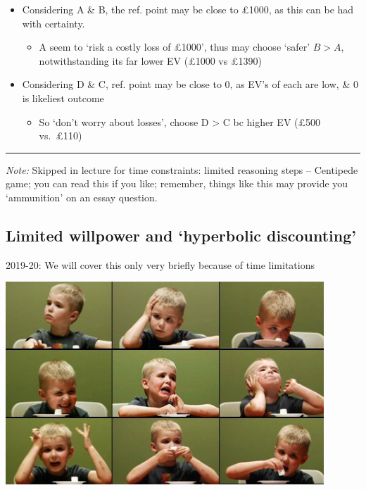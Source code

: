 \documentclass[]{article}
\providecommand{\tightlist}{%
  \setlength{\itemsep}{0pt}\setlength{\parskip}{0pt}}
\begin{document}
\bigskip

\begin{itemize}
\tightlist
\item
  Considering A \& B, the ref. point may be close to \pounds1000, as
  this can be had with certainty.

  \begin{itemize}
  \tightlist
  \item
    A seem to `risk a costly loss of \pounds1000', thus may choose
    `safer' \(B>A\), notwithstanding its far lower EV (\pounds1000 vs
    \pounds1390)
  \end{itemize}
\end{itemize}

\bigskip

\begin{itemize}
\tightlist
\item
  Considering D \& C, ref. point may be close to 0, as EV's of each are
  low, \& 0 is likeliest outcome

  \begin{itemize}
  \tightlist
  \item
    So `don't worry about losses', choose D \textgreater{} C bc higher
    EV (\pounds500 vs.~\pounds110)
  \end{itemize}
\end{itemize}

\begin{center}\rule{0.5\linewidth}{\linethickness}\end{center}

\emph{Note:} Skipped in lecture for time constraints: limited reasoning
steps -- Centipede game; you can read this if you like; remember, things
like this may provide you `ammunition' on an essay question.

\hypertarget{limited-willpower-and-hyperbolic-discounting}{%
\subsection{Limited willpower and `hyperbolic
discounting'}\label{limited-willpower-and-hyperbolic-discounting}}

2019-20: We will cover this only very briefly because of time
limitations

\includegraphics[height=3in]{picsfigs/marshtest.jpg}
\end{document}
